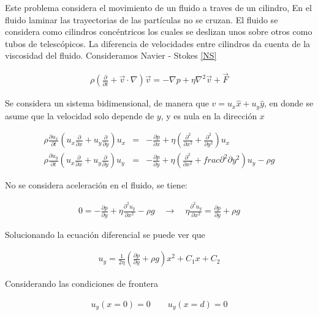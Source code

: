 \noindent Este problema considera el movimiento de un fluido a traves de un cilindro, 
En el fluido laminar las trayectorias de las partículas no se cruzan. El fluido se considera como cilindros concéntricos los cuales se deslizan unos sobre otros como tubos de telescópicos. La diferencia de velocidades entre cilindros da cuenta de la viscosidad del fluido. Consideramos Navier - Stokes \eqref{NS}

\begin{eqnarray*}
\rho \left(\frac{\partial}{\partial t} + \vec{v}\cdot \nabla\right)\vec{v} = - \nabla p + \eta\nabla^{2} \vec{v} + \vec{F}
\end{eqnarray*}

\noindent Se considera un sistema bidimensional, de manera que $v = u_{x}\hat{x} + u_{y}\hat{y}$, en donde se asume que la velocidad solo depende de $y$, y es nula en la dirección $x$

\begin{eqnarray*}
\rho\frac{\partial u_{x}}{\partial t}\left(u_{x}\frac{\partial}{\partial x} + u_{y}\frac{\partial}{\partial y}\right)u_{x} &=& -\frac{\partial p}{\partial x} + \eta\left(\frac{\partial^{2}}{\partial x^{2}}+\frac{\partial^{2}}{\partial y^{2}}\right)u_{x}\\
\rho\frac{\partial u_{y}}{\partial t}\left(u_{x}\frac{\partial}{\partial x} + u_{y}\frac{\partial}{\partial y}\right)u_{y} &=& -\frac{\partial p}{\partial y} + \eta\left(\frac{\partial^{2}}{\partial x^{2}}+frac{\partial^{2}}{\partial y^{2}}\right)u_{y}-\rho g
\end{eqnarray*}

\noindent No se considera aceleración en el fluido, se tiene:

\begin{eqnarray*}
0 = -\frac{\partial p}{\partial y} + \eta\frac{\partial^{2}u_{y}}{\partial x^{2}} - \rho g \quad\longrightarrow\quad \eta\frac{\partial^{2}u_{y}}{\partial x^{2}} =  \frac{\partial p}{\partial y} +  \rho g
\end{eqnarray*}

\noindent Solucionando la ecuación diferencial se puede ver que 

\begin{eqnarray*}
u_{y} = \frac{1}{2\eta}\left(\frac{\partial p}{\partial y} + \rho g\right)x^{2} + C_{1}x +C_{2}
\end{eqnarray*}

\noindent Considerando las condiciones de frontera 

\begin{eqnarray*}
u_{y}(x = 0) = 0 \qquad u_{y}(x = d) = 0  
\end{eqnarray*}

